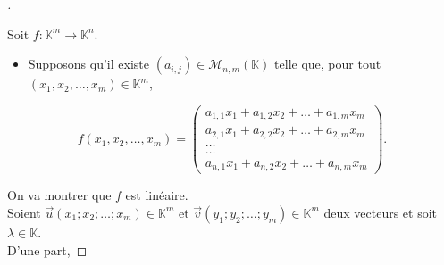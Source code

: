 \documentclass[12pt]{article}
\theoremstyle{break}
\newenvironment{demo}[1][\proofname]{%
  \begin{proof}[#1]$ $\newline
}{%
  \end{proof}
}
\begin{document}
\newpage
\begin{demo}
Soit $f: \mathbb{K}^{m} \longrightarrow \mathbb{K}^{n}$.

\begin{itemize}[noitemsep,topsep=0pt]
  \item Supposons qu'il existe $\left(a_{i, j}\right) \in \mathcal{M}_{n, m}(\mathbb{K})$ telle que, pour tout $\left(x_{1}, x_{2}, \ldots, x_{m}\right) \in \mathbb{K}^{m}$,
\end{itemize}

$$
f\left(x_{1}, x_{2}, \ldots, x_{m}\right)=\left(\begin{array}{c}
a_{1,1} x_{1}+a_{1,2} x_{2}+\ldots+a_{1, m} x_{m} \\
a_{2,1} x_{1}+a_{2,2} x_{2}+\ldots+a_{2, m} x_{m} \\
\ldots \\
\ldots \\
a_{n, 1} x_{1}+a_{n, 2} x_{2}+\ldots+a_{n, m} x_{m}
\end{array}\right) .
$$

On va montrer que $f$ est linéaire.\\
Soient $\vec{u}\left(x_{1} ; x_{2} ; \ldots ; x_{m}\right) \in \mathbb{K}^{m}$ et $\vec{v}\left(y_{1} ; y_{2} ; \ldots ; y_{m}\right) \in \mathbb{K}^{m}$ deux vecteurs et soit $\lambda \in \mathbb{K}$.\\
D'une part,


\end{demo}
\end{document}
